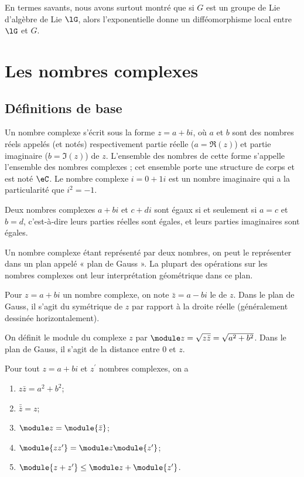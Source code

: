 \begin{remark}
    En termes savants, nous avons surtout montré que si \( G\) est un groupe de Lie d'algèbre de Lie \( \lG\), alors l'exponentielle donne un difféomorphisme local entre \( \lG\) et \( G\).
\end{remark}

 \section{Les nombres complexes}
 \subsection{Définitions de base}
 Un nombre complexe s'écrit sous la forme $z = a + b i$, où $a$ et $b$
 sont des nombres réels appelés (et notés) respectivement partie réelle
 ($a = \Re(z)$) et partie imaginaire ($b = \Im(z)$) de $z$. L'ensemble
 des nombres de cette forme s'appelle l'ensemble des nombres complexes
 ; cet ensemble porte une structure de corps et est noté $\eC$. Le
 nombre complexe $i = 0 + 1 i$ est un nombre imaginaire qui a la
 particularité que $i^2 = -1$.

 Deux nombres complexes $a + bi$ et $c + di$ sont égaux si et seulement
 si $a = c$ et $b = d$, c'est-à-dire leurs parties réelles sont égales,
 et leurs parties imaginaires sont égales.

 Un nombre complexe étant représenté par deux nombres, on peut le
 représenter dans un plan appelé « plan de Gauss ». La plupart des
 opérations sur les nombres complexes ont leur interprétation
 géométrique dans ce plan.

 Pour $z = a + bi$ un nombre complexe, on note $\bar z = a - bi$ le
  de $z$. Dans le plan de Gauss, il s'agit du
 symétrique de $z$ par rapport à la droite réelle (généralement
 dessinée horizontalement).

 On définit le module du complexe $z$ par $\module z = \sqrt{z\bar z} =
 \sqrt{a^2 + b^2}$. Dans le plan de Gauss, il s'agit de la distance
 entre $0$ et $z$.

 \begin{proposition}
Pour tout $z = a+bi$ et $z^\prime$ nombres complexes, on a
   \begin{enumerate}
   \item $z \bar z = a^2 + b^2$;
   \item $\bar{\bar{z}} = z$;
   \item $\module z = \module {\bar z}$;
   \item $\module{zz^\prime} = \module z \module{z^\prime}$;
   \item $\module{z+z^\prime} \leq \module z + \module{z^\prime}$.
   \end{enumerate}
 \end{proposition}

